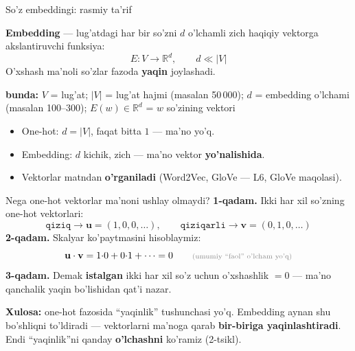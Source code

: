 \documentclass[aspectratio=169,11pt]{beamer}
\newcommand{\bunda}[1]{{\small\textbf{bunda:}\; #1}}
\begin{document}
\begin{frame}{So'z embeddingi: rasmiy ta'rif}
  \begin{tcolorbox}[defbox,title=Ta'rif: so'z embeddingi (word embedding)]
    \textbf{Embedding} --- lug'atdagi har bir so'zni $d$ o'lchamli
    zich haqiqiy vektorga akslantiruvchi funksiya:
    $$ E : V \longrightarrow \mathbb{R}^{d}, \qquad d \ll |V| $$
    O'xshash ma'noli so'zlar fazoda \textbf{yaqin} joylashadi.
  \end{tcolorbox}
  \vspace{5pt}
  \bunda{%
    $V$ = lug'at; $|V|$ = lug'at hajmi (masalan 50\,000);
    $d$ = embedding o'lchami (masalan 100--300);
    $E(w)\in\mathbb{R}^d$ = $w$ so'zining vektori
  }
  \vspace{5pt}
  \begin{itemize}\small\setlength\itemsep{3pt}
    \item One-hot: $d = |V|$, faqat bitta $1$ --- ma'no \alert{yo'q}.
    \item Embedding: $d$ kichik, zich --- ma'no vektor \textbf{yo'nalishida}.
    \item Vektorlar matndan \textbf{o'rganiladi} (Word2Vec, GloVe --- L6, GloVe maqolasi).
  \end{itemize}
\end{frame}

\begin{frame}{Nega one-hot vektorlar ma'noni ushlay olmaydi?}
  \textbf{1-qadam.} Ikki har xil so'zning one-hot vektorlari:
  $$ \texttt{qiziq} \to \mathbf{u}=(1,0,0,\ldots), \qquad
     \texttt{qiziqarli} \to \mathbf{v}=(0,1,0,\ldots) $$
  \pause
  \textbf{2-qadam.} Skalyar ko'paytmasini hisoblaymiz:
  $$ \mathbf{u}\cdot\mathbf{v} = 1{\cdot}0 + 0{\cdot}1 + \cdots = 0
     \qquad\text{\scriptsize\color{halfgray}(umumiy ``faol'' o'lcham yo'q)} $$
  \pause
  \textbf{3-qadam.} Demak \textbf{istalgan} ikki har xil so'z uchun
  o'xshashlik $= 0$ --- ma'no qanchalik yaqin bo'lishidan qat'i nazar.
  \begin{tcolorbox}[okbox]
    \small \textbf{Xulosa:} one-hot fazosida ``yaqinlik'' tushunchasi
    yo'q. Embedding aynan shu bo'shliqni to'ldiradi --- vektorlarni
    ma'noga qarab \textbf{bir-biriga yaqinlashtiradi}. Endi
    ``yaqinlik''ni qanday \textbf{o'lchashni} ko'ramiz (2-tsikl).
  \end{tcolorbox}
\end{frame}
\end{document}
